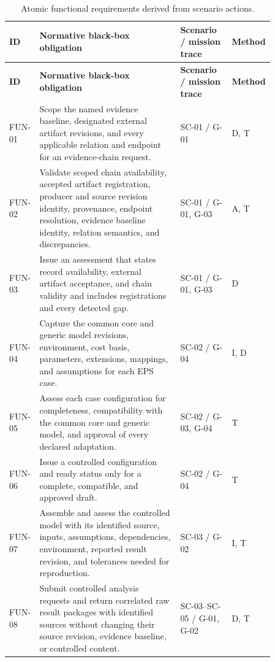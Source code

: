 \documentclass[11pt,a4paper]{article}
\begin{document}
\scriptsize
\begin{longtable}{>{\raggedright\arraybackslash}p{0.07\linewidth} >{\raggedright\arraybackslash}p{0.52\linewidth} >{\raggedright\arraybackslash}p{0.19\linewidth} >{\raggedright\arraybackslash}p{0.08\linewidth}}
    \caption{Atomic functional requirements derived from scenario actions.}\label{tab:framework-functional-requirements}\\
    \toprule
    \textbf{ID} & \textbf{Normative black-box obligation} & \textbf{Scenario / mission trace} & \textbf{Method} \\
    \midrule
    \endfirsthead
    \toprule
    \textbf{ID} & \textbf{Normative black-box obligation} & \textbf{Scenario / mission trace} & \textbf{Method} \\
    \midrule
    \endhead
    FUN-01 & Scope the named evidence baseline, designated external artifact revisions, and every applicable relation and endpoint for an evidence-chain request. & SC-01 / G-01 & D, T \\
    FUN-02 & Validate scoped chain availability, accepted artifact registration, producer and source revision identity, provenance, endpoint resolution, evidence baseline identity, relation semantics, and discrepancies. & SC-01 / G-01, G-03 & A, T \\
    FUN-03 & Issue an assessment that states record availability, external artifact acceptance, and chain validity and includes registrations and every detected gap. & SC-01 / G-01, G-03 & D \\
    FUN-04 & Capture the common core and generic model revisions, environment, cost basis, parameters, extensions, mappings, and assumptions for each EPS case. & SC-02 / G-04 & I, D \\
    FUN-05 & Assess each case configuration for completeness, compatibility with the common core and generic model, and approval of every declared adaptation. & SC-02 / G-03, G-04 & T \\
    FUN-06 & Issue a controlled configuration and ready status only for a complete, compatible, and approved draft. & SC-02 / G-04 & T \\
    FUN-07 & Assemble and assess the controlled model with its identified source, inputs, assumptions, dependencies, environment, reported result revision, and tolerances needed for reproduction. & SC-03 / G-02 & I, T \\
    FUN-08 & Submit controlled analysis requests and return correlated raw result packages with identified sources without changing their source revision, evidence baseline, or controlled content. & SC-03--SC-05 / G-01, G-02 & D, T \\

\end{longtable}
\end{document}
